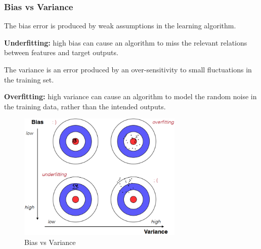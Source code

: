 \subsubsection{Bias vs Variance}
\begin{multicols}{2}
    \begin{flushleft}
        The bias error is produced by weak assumptions in the learning algorithm. 
    \end{flushleft}
    \begin{mdframed}
        \textbf{Underfitting:} high bias can cause an algorithm to miss the relevant relations between features and target outputs.
    \end{mdframed}
    \columnbreak
    The variance is an error produced by an over-sensitivity to small fluctuations in the training set.
    \begin{mdframed}
        \textbf{Overfitting:} high variance can cause an algorithm to model the random noise in the training data, rather than the intended outputs.
    \end{mdframed}
\end{multicols}
\begin{figure}[h]
    \centering
    \includegraphics[width=0.7\textwidth]{images/Bias.png}
    \caption{Bias vs Variance}
\end{figure}

\newpage